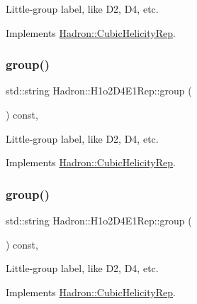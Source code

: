 Little-\/group label, like D2, D4, etc. 

Implements \mbox{\hyperlink{structHadron_1_1CubicHelicityRep_a101a7d76cd8ccdad0f272db44b766113}{Hadron\+::\+Cubic\+Helicity\+Rep}}.

\mbox{\label{structHadron_1_1H1o2D4E1Rep_a450bf31aa04b582fae7cf5cdb6c987f7}} 
\subsubsection{\texorpdfstring{group()}{group()}\hspace{0.1cm}{\footnotesize\ttfamily [2/3]}}
{\footnotesize\ttfamily std\+::string Hadron\+::\+H1o2\+D4\+E1\+Rep\+::group (\begin{DoxyParamCaption}{ }\end{DoxyParamCaption}) const\hspace{0.3cm}{\ttfamily [inline]}, {\ttfamily [virtual]}}

Little-\/group label, like D2, D4, etc. 

Implements \mbox{\hyperlink{structHadron_1_1CubicHelicityRep_a101a7d76cd8ccdad0f272db44b766113}{Hadron\+::\+Cubic\+Helicity\+Rep}}.

\mbox{\label{structHadron_1_1H1o2D4E1Rep_a450bf31aa04b582fae7cf5cdb6c987f7}} 
\subsubsection{\texorpdfstring{group()}{group()}\hspace{0.1cm}{\footnotesize\ttfamily [3/3]}}
{\footnotesize\ttfamily std\+::string Hadron\+::\+H1o2\+D4\+E1\+Rep\+::group (\begin{DoxyParamCaption}{ }\end{DoxyParamCaption}) const\hspace{0.3cm}{\ttfamily [inline]}, {\ttfamily [virtual]}}

Little-\/group label, like D2, D4, etc. 

Implements \mbox{\hyperlink{structHadron_1_1CubicHelicityRep_a101a7d76cd8ccdad0f272db44b766113}{Hadron\+::\+Cubic\+Helicity\+Rep}}.

